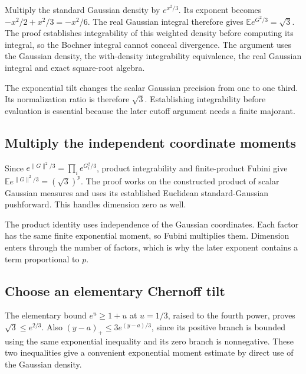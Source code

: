 \documentclass[11pt,a4paper]{report}
\begin{document}
Multiply the standard Gaussian density by \(e^{x^2/3}\). Its exponent becomes \(-x^2/2+x^2/3=-x^2/6\). The real Gaussian integral therefore gives \(\mathbb Ee^{G^2/3}=\sqrt3\). The proof establishes integrability of this weighted density before computing its integral, so the Bochner integral cannot conceal divergence. The argument uses the Gaussian density, the with-density integrability equivalence, the real Gaussian integral and exact square-root algebra.



The exponential tilt changes the scalar Gaussian precision from one to one third. Its normalization ratio is therefore \(\sqrt3\). Establishing integrability before evaluation is essential because the later cutoff argument needs a finite majorant.

\subsection{\texorpdfstring{Multiply the independent coordinate moments}{Multiply the independent coordinate moments}}
\label{report-step-KineticLangevin-GaussianTail-lean-2}


Since \(e^{\lVert G\rVert^2/3}=\prod_i e^{G_i^2/3}\), product integrability and finite-product Fubini give \(\mathbb Ee^{\lVert G\rVert^2/3}=(\sqrt3)^p\). The proof works on the constructed product of scalar Gaussian measures and uses its established Euclidean standard-Gaussian pushforward. This handles dimension zero as well.



The product identity uses independence of the Gaussian coordinates. Each factor has the same finite exponential moment, so Fubini multiplies them. Dimension enters through the number of factors, which is why the later exponent contains a term proportional to \(p\).

\subsection{\texorpdfstring{Choose an elementary Chernoff tilt}{Choose an elementary Chernoff tilt}}
\label{report-step-KineticLangevin-GaussianTail-lean-3}


The elementary bound \(e^u\ge1+u\) at \(u=1/3\), raised to the fourth power, proves \(\sqrt3\le e^{2/3}\). Also \((y-a)_+\le3e^{(y-a)/3}\), since its positive branch is bounded using the same exponential inequality and its zero branch is nonnegative. These two inequalities give a convenient exponential moment estimate by direct use of the Gaussian density.
\end{document}
